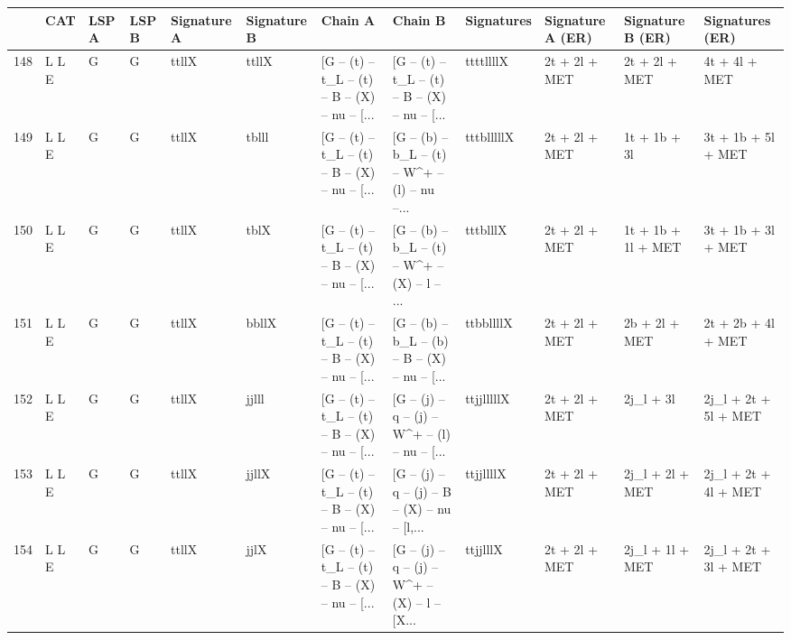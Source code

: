 \begin{tabular}{llllllllllll}
\toprule
{} &          CAT & LSP A & LSP B & Signature A & Signature B &                                            Chain A &                                            Chain B &  Signatures &         Signature A (ER) &         Signature B (ER) &                    Signatures (ER) \\
\midrule
148  &        L L E &     G &     G &       ttllX &       ttllX &  [G -- (t) -- t\_L -- (t) -- B -- (X) -- nu -- [... &  [G -- (t) -- t\_L -- (t) -- B -- (X) -- nu -- [... &   ttttllllX &            2t + 2l + MET &            2t + 2l + MET &                      4t + 4l + MET \\
149  &        L L E &     G &     G &       ttllX &       tblll &  [G -- (t) -- t\_L -- (t) -- B -- (X) -- nu -- [... &  [G -- (b) -- b\_L -- (t) -- W\textasciicircum + -- (l) -- nu --... &  tttblllllX &            2t + 2l + MET &             1t + 1b + 3l &                 3t + 1b + 5l + MET \\
150  &        L L E &     G &     G &       ttllX &        tblX &  [G -- (t) -- t\_L -- (t) -- B -- (X) -- nu -- [... &  [G -- (b) -- b\_L -- (t) -- W\textasciicircum + -- (X) -- l -- ... &    tttblllX &            2t + 2l + MET &       1t + 1b + 1l + MET &                 3t + 1b + 3l + MET \\
151  &        L L E &     G &     G &       ttllX &       bbllX &  [G -- (t) -- t\_L -- (t) -- B -- (X) -- nu -- [... &  [G -- (b) -- b\_L -- (b) -- B -- (X) -- nu -- [... &   ttbbllllX &            2t + 2l + MET &            2b + 2l + MET &                 2t + 2b + 4l + MET \\
152  &        L L E &     G &     G &       ttllX &       jjlll &  [G -- (t) -- t\_L -- (t) -- B -- (X) -- nu -- [... &  [G -- (j) -- q -- (j) -- W\textasciicircum + -- (l) -- nu -- [... &  ttjjlllllX &            2t + 2l + MET &                2j\_l + 3l &               2j\_l + 2t + 5l + MET \\
153  &        L L E &     G &     G &       ttllX &       jjllX &  [G -- (t) -- t\_L -- (t) -- B -- (X) -- nu -- [... &  [G -- (j) -- q -- (j) -- B -- (X) -- nu -- [l,... &   ttjjllllX &            2t + 2l + MET &          2j\_l + 2l + MET &               2j\_l + 2t + 4l + MET \\
154  &        L L E &     G &     G &       ttllX &        jjlX &  [G -- (t) -- t\_L -- (t) -- B -- (X) -- nu -- [... &  [G -- (j) -- q -- (j) -- W\textasciicircum + -- (X) -- l -- [X... &    ttjjlllX &            2t + 2l + MET &          2j\_l + 1l + MET &               2j\_l + 2t + 3l + MET \\

\end{tabular}
